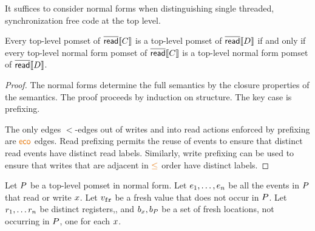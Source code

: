 It suffices to consider normal forms when distinguishing single threaded, synchronization free code at the top level. 

\begin{lemma}\label{unrhd}
Every top-level pomset of $\overline{\mathsf{read}}\llbracket C\rrbracket$ is a top-level pomset of $\overline{\mathsf{read}}\llbracket D\rrbracket$ if and only if 
every top-level normal form pomset of $\overline{\mathsf{read}}\llbracket C\rrbracket$ is a top-level normal form pomset of $\overline{\mathsf{read}}\llbracket D\rrbracket$.
\begin{proof}
The normal forms determine the full semantics by the closure properties of the semantics.     The proof proceeds by induction on structure.  The key case is prefixing. 

The only edges $\lt$-edges out of writes  and into read actions enforced by prefixing are $\reco$ edges.  Read prefixing permits the reuse of events to ensure that distinct read events have distinct read labels.  Similarly, write prefixing can be used to ensure that  writes that are adjacent in $\gtN$ order have distinct labels.
\end{proof}
\end{lemma}



Let $P$ be a top-level pomset in normal form.  Let $e_1, \ldots, e_n$ be all the events in $P$ that read or write $x$.  Let $v_{{\tt fr}}$ be a fresh value that does not occur in $P$.  Let $r_1, \ldots r_n$ be distinct registers,, and $b_{x}, b_{P}$ be a  set of fresh locations, not occurring in $P$, one for each $x$.


